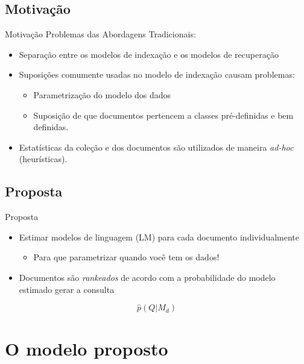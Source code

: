 \documentclass[compress]{beamer}
\begin{document}
\subsection{Motivação}

    \begin{frame}{Motivação}
            Problemas das Abordagens Tradicionais:
            \begin{itemize}
            \item Separação entre os modelos de indexação e os modelos de recuperação
            \item Suposições comumente usadas no modelo de indexação causam problemas:
                \begin{itemize}
                    \item Parametrização do modelo dos dados
                    \item Suposição de que documentos pertencem a classes pré-definidas e bem
                    definidas.
                \end{itemize}
            \item Estatísticas da coleção e dos documentos são utilizados de maneira
            \emph{ad-hoc} (heurísticas).
            \end{itemize}
    \end{frame}

\subsection{Proposta}

    \begin{frame}{Proposta}
            \begin{itemize}
            \item Estimar modelos de linguagem (LM) para cada documento individualmente

            \begin{itemize}
            \item Para que parametrizar quando você tem os dados!
            \end{itemize}
            \item Documentos são \emph{rankeados} de acordo com a probabilidade do modelo estimado
            gerar a consulta
            \end{itemize}
            \[
            \hat{p}(Q|M_{d})\]
    \end{frame}



\section{O modelo proposto}
\end{document}
